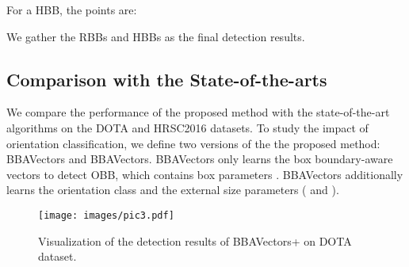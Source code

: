 \documentclass[10pt,twocolumn,letterpaper]{article}
\begin{document}
For a HBB, the points are:
 
We gather the RBBs and HBBs as the final detection results.



\subsection{Comparison with the State-of-the-arts}
We compare the performance of the proposed method with the state-of-the-art algorithms on the DOTA and HRSC2016 datasets. To study the impact of orientation classification, we define two versions of the the proposed method: BBAVectors and BBAVectors. BBAVectors only learns the box boundary-aware vectors to detect OBB, which contains box parameters . BBAVectors additionally learns the orientation class  and the external size parameters ( and ).


 
\begin{figure*}[tbh!]
\begin{center}
   \texttt{[image: images/pic3.pdf]}
\end{center}
\caption{Visualization of the detection results of BBAVectors+ on DOTA dataset.}
\label{fig:figure3}
\end{figure*}
\end{document}
